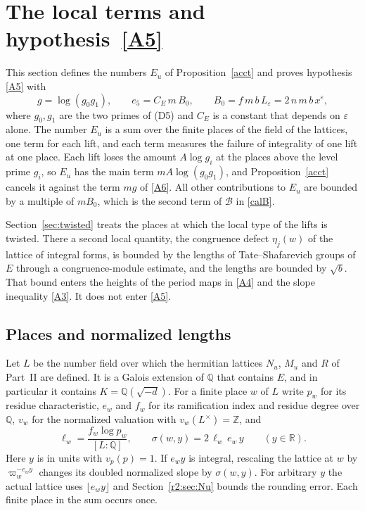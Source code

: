 
\section{The local terms and hypothesis~\texorpdfstring{\eqref{A5}}{(A5)}}\label{r5:sec:localterms}

This section defines the numbers $E_u$ of Proposition~\ref{acct} and proves hypothesis \eqref{A5} with
\[
g=\log(g_0g_1),\qquad e_5=C_E\,m\,B_0,\qquad B_0=f\,m\,b\,L_\varepsilon=2\,n\,m\,b\,x^{\varepsilon},
\]
where $g_0,g_1$ are the two primes of (D5) and $C_E$ is a constant that depends on $\varepsilon$ alone. The number $E_u$ is a sum over the finite places of the field of the lattices, one term for each lift, and each term measures the failure of integrality of one lift at one place. Each lift loses the amount $A\log g_i$ at the places above the level prime $g_i$, so $E_u$ has the main term $mA\log(g_0g_1)$, and Proposition~\ref{acct} cancels it against the term $mg$ of \eqref{A6}. All other contributions to $E_u$ are bounded by a multiple of $mB_0$, which is the second term of $\mathcal B$ in \eqref{calB}.

Section~\ref{sec:twisted} treats the places at which the local type of the lifts is twisted. There a second local quantity, the congruence defect $\eta_j(w)$ of the lattice of integral forms, is bounded by the lengths of Tate--Shafarevich groups of $E$ through a congruence-module estimate, and the lengths are bounded by $\sqrt b$. That bound enters the heights of the period maps in \eqref{A4} and the slope inequality \eqref{A3}. It does not enter \eqref{A5}.

\subsection{Places and normalized lengths}\label{r5:sec:places}

Let $L$ be the number field over which the hermitian lattices $N_u$, $M_u$ and $R$ of Part~II are defined. It is a Galois extension of $\mathbb Q$ that contains $E$, and in particular it contains $K=\mathbb Q(\sqrt{-d})$. For a finite place $w$ of $L$ write $p_w$ for its residue characteristic, $e_w$ and $f_w$ for its ramification index and residue degree over $\mathbb Q$, $v_w$ for the normalized valuation with $v_w(L^\times)=\mathbb Z$, and
\[
\ell_w=\frac{f_w\log p_w}{[L:\mathbb Q]},\qquad\sigma(w,y)=2\,\ell_w\,e_w\,y\qquad(y\in\mathbb R).
\]
Here $y$ is in units with $v_p(p)=1$. If $e_wy$ is integral, rescaling the lattice at $w$ by $\varpi_w^{-e_wy}$ changes its doubled normalized slope by $\sigma(w,y)$. For arbitrary $y$ the actual lattice uses $\lfloor e_wy\rfloor$ and Section~\ref{r2:sec:Nu} bounds the rounding error. Each finite place in the sum occurs once.

